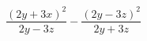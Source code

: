\begin{ex}[type=expression]
	\begin{condition}
		\( \dfrac{(2y+3x)^2}{2y-3z}-\dfrac{(2y-3z)^2}{2y+3z} \)
	\end{condition}
\end{ex}